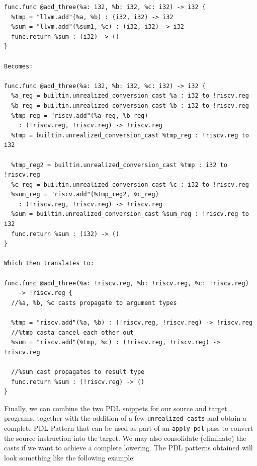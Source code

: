 \begin{verbatim}
func.func @add_three(%a: i32, %b: i32, %c: i32) -> i32 {
  %tmp = "llvm.add"(%a, %b) : (i32, i32) -> i32
  %sum = "llvm.add"(%sum1, %c) : (i32, i32) -> i32
  func.return %sum : (i32) -> ()
} 

Becomes:

func.func @add_three(%a: i32, %b: i32, %c: i32) -> i32 {
  %a_reg = builtin.unrealized_conversion_cast %a : i32 to !riscv.reg 
  %b_reg = builtin.unrealized_conversion_cast %b : i32 to !riscv.reg 
  %tmp_reg = "riscv.add"(%a_reg, %b_reg) 
    : (!riscv.reg, !riscv.reg) -> !riscv.reg
  %tmp = builtin.unrealized_conversion_cast %tmp_reg : !riscv.reg to i32

  %tmp_reg2 = builtin.unrealized_conversion_cast %tmp : i32 to !riscv.reg 
  %c_reg = builtin.unrealized_conversion_cast %c : i32 to !riscv.reg 
  %sum_reg = "riscv.add"(%tmp_reg2, %c_reg) 
    : (!riscv.reg, !riscv.reg) -> !riscv.reg
  %sum = builtin.unrealized_conversion_cast %sum_reg : !riscv.reg to i32
  func.return %sum : (i32) -> ()
} 

Which then translates to:

func.func @add_three(%a: !riscv.reg, %b: !riscv.reg, %c: !riscv.reg) 
    -> !riscv.reg {
  //%a, %b, %c casts propagate to argument types

  %tmp = "riscv.add"(%a, %b) : (!riscv.reg, !riscv.reg) -> !riscv.reg
  //%tmp casta cancel each other out
  %sum = "riscv.add"(%tmp, %c) : (!riscv.reg, !riscv.reg) -> !riscv.reg

  //%sum cast propagates to result type
  func.return %sum : (!riscv.reg) -> ()
} 
\end{verbatim}

Finally, we can combine the two PDL snippets for our source and target programs, together with 
the addition of a few \texttt{unrealized casts} and obtain a complete PDL Pattern that can 
be used as part of an \texttt{apply-pdl} pass to convert the source instruction into the target.
We may also consolidate (eliminate) the casts if we want to achieve a complete lowering. The PDL
patterns obtained will look something like the following example:

